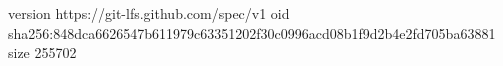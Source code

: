 version https://git-lfs.github.com/spec/v1
oid sha256:848dca6626547b611979c63351202f30c0996acd08b1f9d2b4e2fd705ba63881
size 255702
